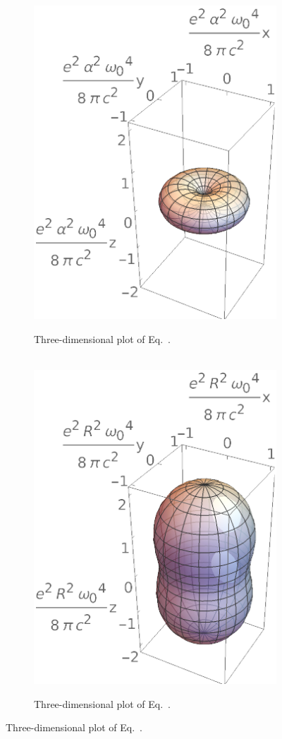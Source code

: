 \begin{figure}[b!]
	\bigskip
	
	\begin{minipage}{0.475\textwidth}
		\begin{figure}[H] \flushleft
			$\quad$ \includegraphics{3a3d}
			\caption{Three-dimensional plot of Eq.~.}
			\label{3a3d}
		\end{figure}
	\end{minipage}%
	\hspace{0.05\linewidth}%
	\begin{minipage}{0.475\textwidth}
		\begin{figure}[H] \flushleft
			$\quad$ \includegraphics{3b3d}
			\caption{Three-dimensional plot of Eq.~.}
			\label{3b3d}
		\end{figure}
	\end{minipage}
\end{figure}

